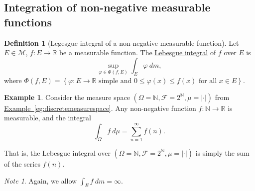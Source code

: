 \documentclass[a4paper]{scrartcl}
\newcommand{\R}{\mathbb{R}}
\newcommand{\N}{\mathbb{N}}
\newcommand{\defn}[1]{\ul{#1}}
\newcommand{\abs}[1]{\left|#1\right|}
\theoremstyle{definition}
\newtheorem{definition}{Definition}[section]
\newtheorem{example}{Example}[section]
\theoremstyle{plain}
\theoremstyle{remark}
\newtheorem{note}{Note}[section]
\begin{document}
\subsection{Integration of non-negative measurable functions}
\begin{definition}[Legesgue integral of a non-negative measurable function]
  \label{def:lebesgueintegralofnonnegativemeasurablefunction}
  Let $E \in \mathcal{M}$, $f\colon E \to \R$ be a measurable function. The \defn{Lebesgue integral} of $f$ over $E$ is
  \begin{equation*}
    \sup_{\varphi \in \Phi(f, E)} \int_{E} \varphi\ dm,
  \end{equation*}
  where $\Phi(f, E) = \left\{ \varphi\colon E \to \R \text{ simple and }0 \leq \varphi(x) \leq f(x)\text{ for all }x \in E \right\}$.
\end{definition}

\begin{example}
  \label{eg:lebesgueintegralcanbesum}
  Consider the measure space $(\Omega = \N, \mathcal{F} = 2^{\N}, \mu = \abs{\cdot})$ from \hyperref[eg:discretemeasurespace]{Example~\ref*{eg:discretemeasurespace}}. Any non-negative function $f\colon \N \to \R$ is measurable, and the integral
  \begin{equation*}
    \int_{\Omega} f\ d\mu = \sum_{n = 1}^{\infty} f(n).
  \end{equation*}

  That is, the Lebesgue integral over $(\Omega = \N, \mathcal{F} = 2^{\N}, \mu = \abs{\cdot})$ is simply the sum of the series $f(n)$.
\end{example}

\begin{note}
  Again, we allow $\int_{E} f\ dm = \infty$.
\end{note}
\end{document}
